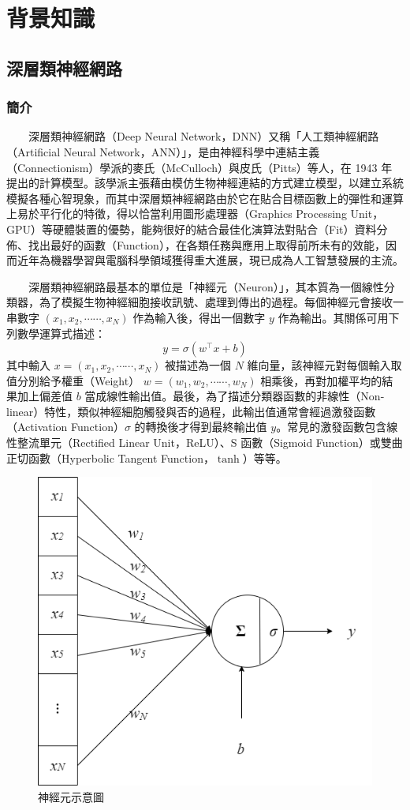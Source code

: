 
\chapter{背景知識}
\section{深層類神經網路}

\subsection{簡介}

　　深層類神經網路（Deep Neural Network，DNN）又稱「人工類神經網路（Artificial Neural Network，ANN）」，是由神經科學中連結主義（Connectionism）學派的麥氏（McCulloch）與皮氏（Pitts）等人，在 1943 年 \cite{mcculloch_logical_1943} 提出的計算模型。該學派主張藉由模仿生物神經連結的方式建立模型，以建立系統模擬各種心智現象，而其中深層類神經網路由於它在貼合目標函數上的彈性和運算上易於平行化的特徵，得以恰當利用圖形處理器（Graphics Processing Unit，GPU）等硬體裝置的優勢，能夠很好的結合最佳化演算法對貼合（Fit）資料分佈、找出最好的函數（Function），在各類任務與應用上取得前所未有的效能，因而近年為機器學習與電腦科學領域獲得重大進展，現已成為人工智慧發展的主流。

　　深層類神經網路最基本的單位是「神經元（Neuron）」，其本質為一個線性分類器，為了模擬生物神經細胞接收訊號、處理到傳出的過程。每個神經元會接收一串數字 \((x_1, x_2, \cdots\cdots, x_N)\) 作為輸入後，得出一個數字 \(y\) 作為輸出。其關係可用下列數學運算式描述：
$$y=\sigma(w^\top x + b) $$
其中輸入 $x = (x_1, x_2, \cdots\cdots, x_N)$ 被描述為一個 $N$ 維向量，該神經元對每個輸入取值分別給予權重（Weight） $w = (w_1, w_2, \cdots\cdots, w_N)$ 相乘後，再對加權平均的結果加上偏差值 $b$ 當成線性輸出值。最後，為了描述分類器函數的非線性（Non-linear）特性，類似神經細胞觸發與否的過程，此輸出值通常會經過激發函數（Activation Function）$\sigma$ 的轉換後才得到最終輸出值 $y$。常見的激發函數包含線性整流單元（Rectified Linear Unit，ReLU）、S 函數（Sigmoid Function）或雙曲正切函數（Hyperbolic Tangent Function，$\tanh$）等等。


\begin{figure}
    \centering
    \includegraphics[width=0.5\linewidth]{figures/neuron.drawio.png}
    \caption{神經元示意圖}
    \label{fig:single-neuron}
\end{figure}

